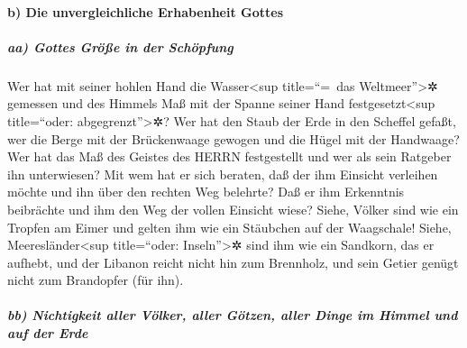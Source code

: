 \hypertarget{b-die-unvergleichliche-erhabenheit-gottes}{%
\paragraph{b) Die unvergleichliche Erhabenheit
Gottes}\label{b-die-unvergleichliche-erhabenheit-gottes}}

\hypertarget{aa-gottes-gruxf6uxdfe-in-der-schuxf6pfung}{%
\subparagraph{aa) Gottes Größe in der
Schöpfung}\label{aa-gottes-gruxf6uxdfe-in-der-schuxf6pfung}}

Wer hat mit seiner hohlen Hand die Wasser\textless sup
title=``=~das Weltmeer''\textgreater✲ gemessen und des Himmels Maß mit
der Spanne seiner Hand festgesetzt\textless sup title=``oder:
abgegrenzt''\textgreater✲? Wer hat den Staub der Erde in den Scheffel
gefaßt, wer die Berge mit der Brückenwaage gewogen und die Hügel mit der
Handwaage? Wer hat das Maß des Geistes des HERRN
festgestellt und wer als sein Ratgeber ihn unterwiesen?
Mit wem hat er sich beraten, daß der ihm Einsicht
verleihen möchte und ihn über den rechten Weg belehrte? Daß er ihm
Erkenntnis beibrächte und ihm den Weg der vollen Einsicht wiese?
Siehe, Völker sind wie ein Tropfen am Eimer und gelten
ihm wie ein Stäubchen auf der Waagschale! Siehe,
Meeresländer\textless sup title=``oder: Inseln''\textgreater✲ sind ihm
wie ein Sandkorn, das er aufhebt, und der Libanon reicht
nicht hin zum Brennholz, und sein Getier genügt nicht zum Brandopfer
(für ihn).

\hypertarget{bb-nichtigkeit-aller-vuxf6lker-aller-guxf6tzen-aller-dinge-im-himmel-und-auf-der-erde}{%
\subparagraph{bb) Nichtigkeit aller Völker, aller Götzen, aller Dinge im
Himmel und auf der
Erde}\label{bb-nichtigkeit-aller-vuxf6lker-aller-guxf6tzen-aller-dinge-im-himmel-und-auf-der-erde}}

